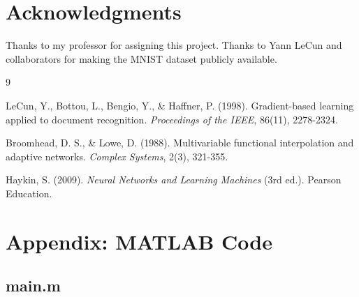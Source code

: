 \documentclass[12pt]{article}
\begin{document}
	\section*{Acknowledgments}
	
	Thanks to my professor for assigning this project. Thanks to Yann LeCun and collaborators for making the MNIST dataset publicly available.
	
	\begin{thebibliography}{9}
		
		 LeCun, Y., Bottou, L., Bengio, Y., \& Haffner, P. (1998). Gradient-based learning applied to document recognition. \textit{Proceedings of the IEEE}, 86(11), 2278-2324.
		
		 Broomhead, D. S., \& Lowe, D. (1988). Multivariable functional interpolation and adaptive networks. \textit{Complex Systems}, 2(3), 321-355.
		
		 Haykin, S. (2009). \textit{Neural Networks and Learning Machines} (3rd ed.). Pearson Education.
		
	\end{thebibliography}
	
	\newpage
	\section*{Appendix: MATLAB Code}
	
	\subsection*{main.m}
	
\end{document}
